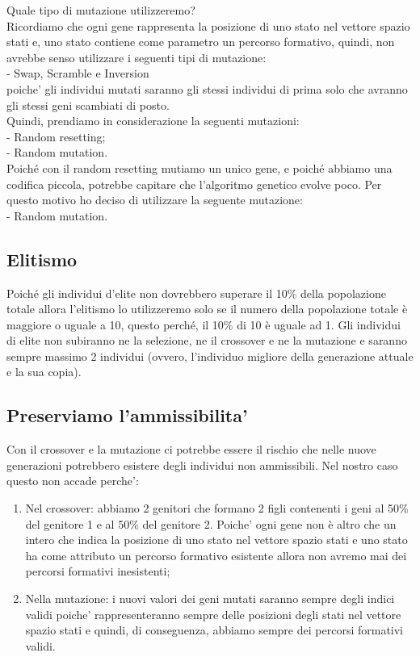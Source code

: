 \documentclass[10pt,a4paper]{article}
\begin{document}
    Quale tipo di mutazione utilizzeremo?\\
    Ricordiamo che ogni gene rappresenta la posizione di uno stato nel vettore spazio stati e, uno stato contiene come parametro 
    un percorso formativo, quindi, non avrebbe senso utilizzare i seguenti tipi di mutazione:\\
    - Swap, Scramble e Inversion\\
    poiche' gli individui mutati saranno gli stessi individui di prima solo che avranno gli stessi geni scambiati di posto.\\
    Quindi, prendiamo in considerazione la seguenti mutazioni:\\
    - Random resetting;\\
    - Random mutation.\\
    Poiché con il random resetting mutiamo un unico gene, e poiché abbiamo una codifica piccola, potrebbe capitare che l'algoritmo genetico evolve poco.
    Per questo motivo ho deciso di utilizzare la seguente mutazione:\\
     - Random mutation.\\
    
     \subsection{Elitismo}
    \label{elitismoSubsection}
    Poiché gli individui d'elite non dovrebbero superare il 10\% della popolazione totale allora l'elitismo lo utilizzeremo solo se il numero della 
    popolazione totale è maggiore o uguale a 10, questo perché, il 10\% di 10 è uguale ad 1.
    Gli individui di elite non subiranno ne la selezione, ne il crossover e ne la mutazione e saranno sempre massimo 2 individui 
    (ovvero, l'individuo migliore della generazione attuale e la sua copia).
    
  
    \subsection{Preserviamo l'ammissibilita'}
    \label{PreserviamoAmmissibilitaSubsection}
    Con il crossover e la mutazione ci potrebbe essere il rischio che nelle nuove generazioni potrebbero esistere degli individui non ammissibili. 
    Nel nostro caso questo non accade perche':
    \begin{enumerate}
      \item Nel crossover: abbiamo 2 genitori che formano 2 figli contenenti i geni al 50\% del genitore 1 e al 50\% del genitore 2. 
      Poiche' ogni gene non è altro che un intero che indica la posizione di uno stato nel vettore spazio stati e uno stato ha come attributo un 
      percorso formativo esistente allora non avremo mai dei percorsi formativi inesistenti;
      \item Nella mutazione: i nuovi valori dei geni mutati saranno sempre degli indici validi poiche' rappresenteranno sempre delle posizioni degli stati nel 
      vettore spazio stati e quindi, di conseguenza, abbiamo sempre dei percorsi formativi validi.
    \end{enumerate}
    
\end{document}
